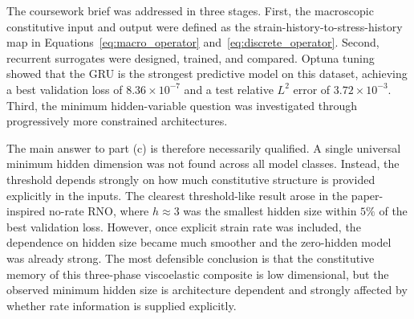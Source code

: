 \documentclass[11pt,a4paper]{article}
\begin{document}
The coursework brief was addressed in three stages. First, the macroscopic constitutive input and output were defined as the strain-history-to-stress-history map in Equations~\eqref{eq:macro_operator} and~\eqref{eq:discrete_operator}. Second, recurrent surrogates were designed, trained, and compared. Optuna tuning showed that the GRU is the strongest predictive model on this dataset, achieving a best validation loss of $8.36\times 10^{-7}$ and a test relative $L^2$ error of $3.72\times 10^{-3}$. Third, the minimum hidden-variable question was investigated through progressively more constrained architectures.

The main answer to part (c) is therefore necessarily qualified. A single universal minimum hidden dimension was not found across all model classes. Instead, the threshold depends strongly on how much constitutive structure is provided explicitly in the inputs. The clearest threshold-like result arose in the paper-inspired no-rate RNO, where $h\approx 3$ was the smallest hidden size within $5\%$ of the best validation loss. However, once explicit strain rate was included, the dependence on hidden size became much smoother and the zero-hidden model was already strong. The most defensible conclusion is that the constitutive memory of this three-phase viscoelastic composite is low dimensional, but the observed minimum hidden size is architecture dependent and strongly affected by whether rate information is supplied explicitly.



\end{document}
